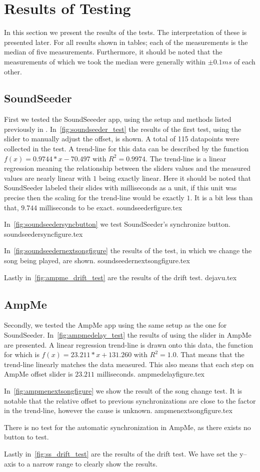 \section{Results of Testing}
In this section we present the results of the tests.
The interpretation of these is presented later.
For all results shown in tables; each of the measurements is the median of five measurements.
Furthermore, it should be noted that the measurements of which we took the median were generally within $\pm 0.1 ms$ of each other.

\subsection{SoundSeeder}
First we tested the SoundSeeeder app, using the setup and methods listed previously in .
In~\vref{fig:soundseeder_test} the results of the first test, using the slider to manually adjust the offset, is shown.
A total of 115 datapoints were collected in the test.
A trend-line for this data can be described by the function $f(x) = 0.9744 * x - 70.497$ with $R^2=0.9974$.
The trend-line is a linear regression meaning the relationship between the sliders values and the measured values are nearly linear with $1$ being exactly linear.
Here it should be noted that SoundSeeder labeled their slides with milliseconds as a unit, if this unit was precise then the scaling for the trend-line would be exactly $1$.
It is a bit less than that, $9.744$ milliseconds to be exact.
{soundseederfigure.tex}

In~\vref{fig:soundseedersyncbutton} we test SoundSeeder's synchronize button.
{soundseedersyncfigure.tex}

In~\vref{fig:soundseedernextsongfigure} the results of the test, in which we change the song being played, are shown.
{soundseedernextsongfigure.tex}

Lastly in~\vref{fig:ampme_drift_test} are the results of the drift test.
{dejavu.tex}

\subsection{AmpMe}
Secondly, we tested the AmpMe app using the same setup as the one for SoundSeeder.
In~\vref{fig:ampmedelay_test} the results of using the slider in AmpMe are presented.
A linear regression trend-line is drawn onto this data, the function for which is $f(x) = 23.211 * x + 131.260$ with $R^2 = 1.0$.
That means that the trend-line linearly matches the data measured.
This also means that each step on AmpMe offset slider is $23.211$ milliseconds.
{ampmedelayfigure.tex}

In~\vref{fig:ampmenextsongfigure} we show the result of the song change test.
It is notable that the relative offset to previous synchronizations are close to the factor in the trend-line, however the cause is unknown.
{ampmenextsongfigure.tex}

There is no test for the automatic synchronization in AmpMe, as there exists no button to test.

Lastly in~\vref{fig:ss_drift_test} are the results of the drift test.
We have set the y--axis to a narrow range to clearly show the results.
